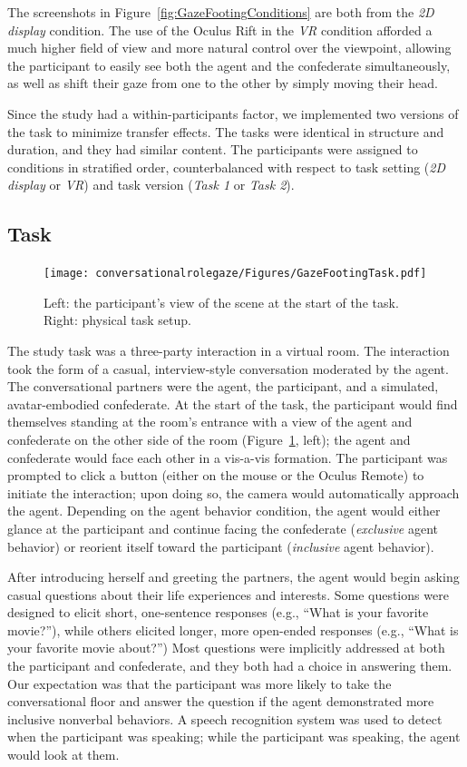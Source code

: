The screenshots in Figure~\ref{fig:GazeFootingConditions} are both from the \emph{2D display} condition. The use of the Oculus Rift in the \emph{VR} condition afforded a much higher field of view and more natural control over the viewpoint, allowing the participant to easily see both the agent and the confederate simultaneously, as well as shift their gaze from one to the other by simply moving their head.

Since the study had a within-participants factor, we implemented two versions of the task to minimize transfer effects. The tasks were identical in structure and duration, and they had similar content. The participants were assigned to conditions in stratified order, counterbalanced with respect to task setting (\emph{2D display} or \emph{VR}) and task version (\emph{Task 1} or \emph{Task 2}).

\subsection{Task}

\begin{figure}
\centering
\texttt{[image: conversationalrolegaze/Figures/GazeFootingTask.pdf]}
\caption{Left: the participant's view of the scene at the start of the task. Right: physical task setup.}
\label{fig:GazeFootingTask}
\end{figure}

The study task was a three-party interaction in a virtual room. The interaction took the form of a casual, interview-style conversation moderated by the agent. The conversational partners were the agent, the participant, and a simulated, avatar-embodied confederate. At the start of the task, the participant would find themselves standing at the room's entrance with a view of the agent and confederate on the other side of the room (Figure~\ref{fig:GazeFootingTask}, left); the agent and confederate would face each other in a vis-a-vis formation. The participant was prompted to click a button (either on the mouse or the Oculus Remote) to initiate the interaction; upon doing so, the camera would automatically approach the agent. Depending on the agent behavior condition, the agent would either glance at the participant and continue facing the confederate (\emph{exclusive} agent behavior) or reorient itself toward the participant (\emph{inclusive} agent behavior).

After introducing herself and greeting the partners, the agent would begin asking casual questions about their life experiences and interests. Some questions were designed to elicit short, one-sentence responses (e.g., ``What is your favorite movie?''), while others elicited longer, more open-ended responses (e.g., ``What is your favorite movie about?'') Most questions were implicitly addressed at both the participant and confederate, and they both had a choice in answering them. Our expectation was that the participant was more likely to take the conversational floor and answer the question if the agent demonstrated more inclusive nonverbal behaviors. A speech recognition system was used to detect when the participant was speaking; while the participant was speaking, the agent would look at them.

